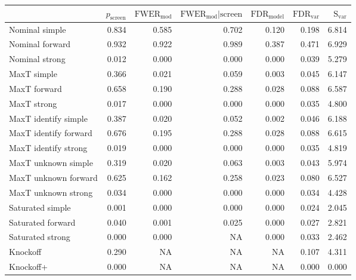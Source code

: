 
\newcommand{\guarantee}[1]{{\color{blue} #1}}
\begin{tabular}{|l|rrrrrr|}
 \hline
{} &  $p_{\text{screen}}$ &  $\text{FWER}_{\text{mod}}$ &  $\text{FWER}_{\text{mod}} \vert \text{screen}$ &  $\text{FDR}_{\text{model}}$ &  $\text{FDR}_{\text{var}}$ &  $\text{S}_{\text{var}}$ \\ \hline
Nominal simple & 0.834 & 0.585 & 0.702 & 0.120 & 0.198 & 6.814 \\ 
Nominal forward & 0.932 & 0.922 & 0.989 & 0.387 & 0.471 & 6.929 \\ 
Nominal strong & 0.012 & 0.000 & 0.000 & 0.000 & 0.039 & 5.279 \\ 
MaxT simple & 0.366 & \guarantee{0.021} & \guarantee{0.059} & \guarantee{0.003} & 0.045 & 6.147 \\ 
MaxT forward & 0.658 & 0.190 & 0.288 & \guarantee{0.028} & 0.088 & 6.587 \\ 
MaxT strong & 0.017 & \guarantee{0.000} & 0.000 & \guarantee{0.000} & 0.035 & 4.800 \\ 
MaxT identify simple & 0.387 & \guarantee{0.020} & \guarantee{0.052} & \guarantee{0.002} & 0.046 & 6.188 \\ 
MaxT identify forward & 0.676 & 0.195 & 0.288 & \guarantee{0.028} & 0.088 & 6.615 \\ 
MaxT identify strong & 0.019 & \guarantee{0.000} & 0.000 & \guarantee{0.000} & 0.035 & 4.819 \\ 
MaxT unknown simple & 0.319 & \guarantee{0.020} & \guarantee{0.063} & \guarantee{0.003} & 0.043 & 5.974 \\ 
MaxT unknown forward & 0.625 & 0.162 & 0.258 & \guarantee{0.023} & 0.080 & 6.527 \\ 
MaxT unknown strong & 0.034 & \guarantee{0.000} & 0.000 & \guarantee{0.000} & 0.034 & 4.428 \\ 
Saturated simple & 0.001 & 0.000 & 0.000 & 0.000 & 0.024 & 2.045 \\ 
Saturated forward & 0.040 & 0.001 & 0.025 & 0.000 & 0.027 & 2.821 \\ 
Saturated strong & 0.000 & 0.000 & NA & 0.000 & 0.033 & 2.462 \\ 
Knockoff & 0.290 & NA & NA & NA & 0.107 & 4.311 \\ 
Knockoff+ & 0.000 & NA & NA & NA & \guarantee{0.000} & 0.000 \\   \hline
\end{tabular}